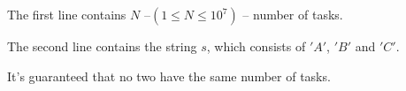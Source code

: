 The first line contains $N$ --$(1 \le N \le 10^7) $ -- number of tasks.

The second line contains the string $s$, which consists of $'A'$, $'B'$ and $'C'$.

It's guaranteed that no two have the same number of tasks.